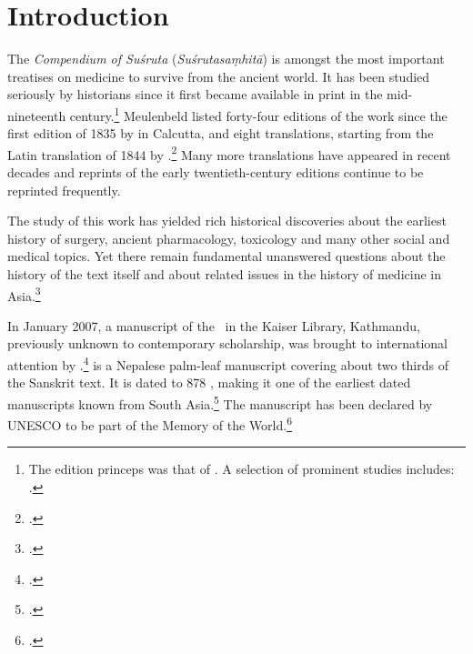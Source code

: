 \chapter{Introduction}


The \emph{Compendium of Suśruta} (\emph{Suśrutasaṃhitā}) is amongst the most
important treatises on medicine to survive from the ancient world. It has been
studied seriously by historians since it first became available in print in the
mid-nineteenth century.\footnote{The edition princeps was that of
    \citet{gupt-1835}.  A selection of prominent studies includes:
    \cites{hoer-1897,hoer-1906a,hoer-1906b,hoer-1907a,hoer-1907,stra-1934,
    sing-1972a,shar-1975, ray-1980, adri-1984,
    yano-1986,meul-hist,shar-1999,vali-2007}[and Meulenbeld's magnum 
    opus][]{meul-hist}.} %
    Meulenbeld listed forty-four editions of the work since the first edition of 1835
    by \citeauthor{gupt-1835} in Calcutta, and eight translations, starting from the
    Latin translation of 1844 by \citeauthor{hess-1855}.\footcite[IB,
    311\,ff.]{meul-hist}   Many more translations have appeared in recent decades and
    reprints of the early twentieth-century editions continue to be reprinted frequently.

The study of this work has yielded rich historical discoveries about 
the earliest history of surgery, ancient pharmacology, toxicology and many other 
social and medical topics. Yet there remain fundamental unanswered questions 
about the history of the text itself and about related issues in the history of 
medicine in Asia.\footcite[IA, 203–389]{meul-hist}

In January 2007, a manuscript of the \SS\ in the Kaiser Library, Kathmandu,
previously unknown to contemporary scholarship, was brought to international
attention by \citeauthor{dimi-kais}.\footcite{dimi-kais}  is a 
Nepalese palm-leaf
manuscript covering about two thirds of the Sanskrit text. It is dated to 878 \CE,
making it one of the earliest dated manuscripts known from South
Asia.\footcite[87–88]{hari-2011} The manuscript has been declared by UNESCO to be
part of the Memory of the World.\footcite{unes-2013}

